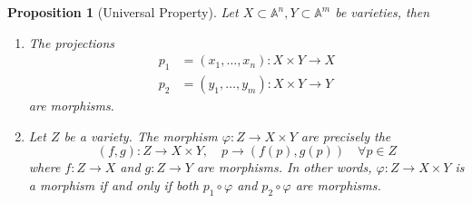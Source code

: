 \documentclass{amsart}
\theoremstyle{plain}
\newtheorem{proposition}{Proposition}
\theoremstyle{definition}
\theoremstyle{remark}
\numberwithin{equation}{section}
\begin{document}
	\begin{proposition}[Universal Property]\label{19}
		Let $ X\subset\mathbb{A}^n,Y \subset \mathbb{A}^m$ be varieties, then
		\begin{enumerate}
			\item The projections
			$$\begin{array}{cc}
			p_1 & =(x_1,\dots,x_n): X\times Y\to X\\
			p_2 & =(y_1,\dots,y_m): X\times Y\to Y
			\end{array}$$
			are morphisms.
			\item Let $ Z $ be a variety. The morphism $ \varphi : Z\to X \times Y $ are precisely the
			$$
			(f,g):Z\to X\times Y,\quad p\to (f(p),g(p))\quad\forall p\in Z
			$$
			where $ f:Z\to X $ and $ g:Z\to Y $ are morphisms. In other words, $ \varphi:Z\to X\times Y $ is a morphism if and only if both $ p_1\circ \varphi $ and $ p_2\circ\varphi  $ are morphisms.
		\end{enumerate}
	\end{proposition}
\end{document}
